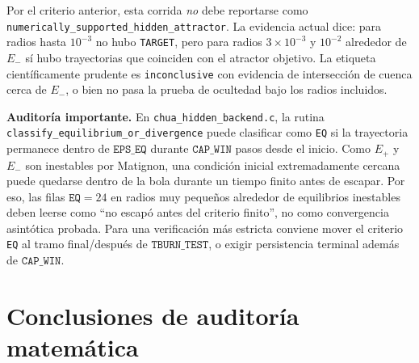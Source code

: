 \documentclass[11pt]{article}
\begin{document}
Por el criterio anterior, esta corrida \emph{no} debe reportarse como
\texttt{numerically\_supported\_hidden\_attractor}. La evidencia actual dice:
para radios hasta \(10^{-3}\) no hubo \texttt{TARGET}, pero para radios
\(3\times10^{-3}\) y \(10^{-2}\) alrededor de \(E_-\) sí hubo trayectorias que
coinciden con el atractor objetivo. La etiqueta científicamente prudente es
\texttt{inconclusive} con evidencia de intersección de cuenca cerca de
\(E_-\), o bien no pasa la prueba de ocultedad bajo los radios incluidos.

\textbf{Auditoría importante.} En \texttt{chua\_hidden\_backend.c}, la rutina
\texttt{classify\_equilibrium\_or\_divergence} puede clasificar como
\texttt{EQ} si la trayectoria permanece dentro de \(\texttt{EPS\_EQ}\) durante
\(\texttt{CAP\_WIN}\) pasos desde el inicio. Como \(E_+\) y \(E_-\) son
inestables por Matignon, una condición inicial extremadamente cercana puede
quedarse dentro de la bola durante un tiempo finito antes de escapar. Por
eso, las filas \(\texttt{EQ}=24\) en radios muy pequeños alrededor de
equilibrios inestables deben leerse como ``no escapó antes del criterio
finito'', no como convergencia asintótica probada. Para una verificación más
estricta conviene mover el criterio \texttt{EQ} al tramo final/después de
\(\texttt{TBURN\_TEST}\), o exigir persistencia terminal además de
\(\texttt{CAP\_WIN}\).

\section{Conclusiones de auditoría matemática}
\end{document}
